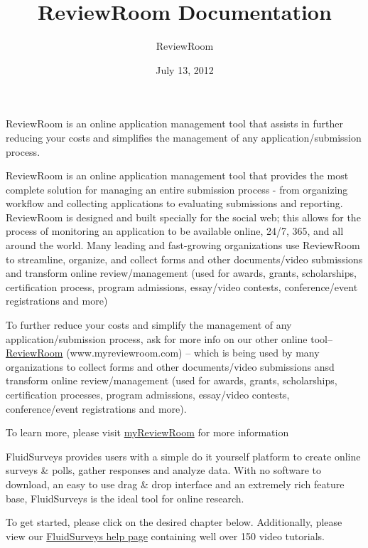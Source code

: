 \documentclass[letterpaper,10pt,english]{sphinxmanual}
\title{ReviewRoom Documentation}
\date{July 13, 2012}
\author{ReviewRoom}
\begin{document}
\maketitle
\tableofcontents
{}\label{index::doc}


ReviewRoom is an online application management tool that assists in further reducing your costs and simplifies the management of any application/submission process.

ReviewRoom is an online application management tool that provides the most complete solution for managing an entire submission process - from organizing workflow and collecting applications to evaluating submissions and reporting. ReviewRoom is designed and built specially for the social web; this allows for the process of monitoring an application to be available online, 24/7, 365, and all around the world. Many leading and fast-growing organizations use ReviewRoom to streamline, organize, and collect forms and other documents/video submissions and transform online review/management (used for awards, grants, scholarships, certification process, program admissions, essay/video contests, conference/event registrations and more)

To further reduce your costs and simplify the management of any application/submission process, ask for more info on our other online tool-- \href{http://www.myreviewroom.com}{ReviewRoom} (www.myreviewroom.com) --  which is being used by many organizations to collect forms and other documents/video submissions ansd transform online review/management (used for awards, grants, scholarships, certification processes, program admissions, essay/video contests, conference/event registrations and more).

To learn more, please visit \href{http://www.myreviewroom.com}{myReviewRoom} for more information

FluidSurveys provides users with a simple do it yourself platform to create online surveys \& polls, gather responses and analyze data. With no software to download, an easy to use drag \& drop interface and an extremely rich feature base, FluidSurveys is the ideal tool for online research.

To get started, please click on the desired chapter below. Additionally, please view our \href{http://www.fluidsurveys.com/help-tutorials}{FluidSurveys help page} containing well over 150 video tutorials.
\end{document}
